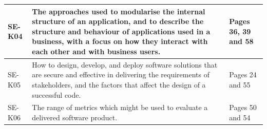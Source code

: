 \begin{longtable}{|p{2cm}|p{8cm}|p{4cm}|}
      SE-K04              & The approaches used to modularise the internal structure of an
                            application, and to describe the structure and behaviour of applications
                            used in a business, with a focus on how they interact with each other
                            and with business users. & Pages 36, 39 and 58 \\ \hline

      SE-K05              & How to design, develop, and deploy software solutions that are secure
                            and effective in delivering the requirements of stakeholders, and
                            the factors that affect the design of a successful code. & Pages 24 and 55 \\ \hline

      SE-K06              & The range of metrics which might be used to evaluate a delivered
                            software product. & Pages 50 and 54 \\ \hline

      
    \end{longtable}